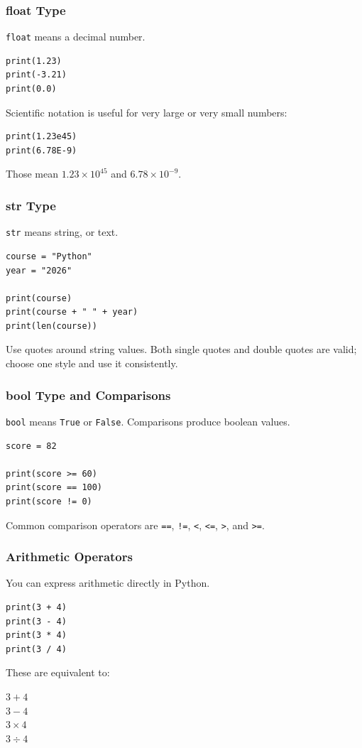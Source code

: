 \documentclass{beamer}
\begin{document}
	\begin{frame}[fragile]
		\frametitle{float Type}

		\texttt{float} means a decimal number.
		\begin{lstlisting}
print(1.23)
print(-3.21)
print(0.0)
		\end{lstlisting}

		Scientific notation is useful for very large or very small numbers:
		\begin{lstlisting}
print(1.23e45)
print(6.78E-9)
		\end{lstlisting}

		Those mean $1.23 \times 10^{45}$ and $6.78 \times 10^{-9}$.
	\end{frame}

	\begin{frame}[fragile]
		\frametitle{str Type}

		\texttt{str} means string, or text.
		\begin{lstlisting}
course = "Python"
year = "2026"

print(course)
print(course + " " + year)
print(len(course))
		\end{lstlisting}

		Use quotes around string values. Both single quotes and double quotes are
		valid; choose one style and use it consistently.
	\end{frame}

	\begin{frame}[fragile]
		\frametitle{bool Type and Comparisons}

		\texttt{bool} means \texttt{True} or \texttt{False}.
		Comparisons produce boolean values.
		\begin{lstlisting}
score = 82

print(score >= 60)
print(score == 100)
print(score != 0)
		\end{lstlisting}

		Common comparison operators are \texttt{==}, \texttt{!=}, \texttt{<},
		\texttt{<=}, \texttt{>}, and \texttt{>=}.
	\end{frame}

	\begin{frame}[fragile]
		\frametitle{Arithmetic Operators}

		You can express arithmetic directly in Python.
		\begin{lstlisting}
print(3 + 4)
print(3 - 4)
print(3 * 4)
print(3 / 4)
		\end{lstlisting}

		These are equivalent to:
		\begin{example}
			$3 + 4$ \\
			$3 - 4$ \\
			$3 \times 4$ \\
			$3 \div 4$
		\end{example}
	\end{frame}
\end{document}
